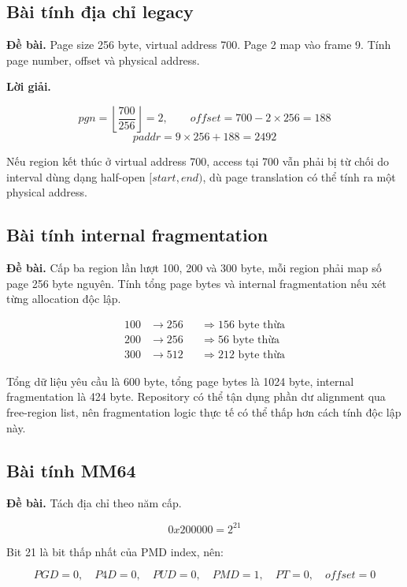 \documentclass[12pt,a4paper]{article}
\newcommand{\code}[1]{\texttt{\detokenize{#1}}}
\begin{document}
\subsection{Bài tính địa chỉ legacy}

\textbf{Đề bài.} Page size 256 byte, virtual address 700. Page 2 map vào frame
9. Tính page number, offset và physical address.

\textbf{Lời giải.}

\[
pgn=\left\lfloor\frac{700}{256}\right\rfloor=2,\qquad
offset=700-2\times256=188
\]
\[
paddr=9\times256+188=2492
\]

Nếu region kết thúc ở virtual address 700, access tại 700 vẫn phải bị từ chối
do interval dùng dạng half-open \([start,end)\), dù page translation có thể
tính ra một physical address.

\subsection{Bài tính internal fragmentation}

\textbf{Đề bài.} Cấp ba region lần lượt 100, 200 và 300 byte, mỗi region phải
map số page 256 byte nguyên. Tính tổng page bytes và internal fragmentation
nếu xét từng allocation độc lập.

\[
\begin{aligned}
100 &\rightarrow 256 &&\Rightarrow 156\text{ byte thừa}\\
200 &\rightarrow 256 &&\Rightarrow 56\text{ byte thừa}\\
300 &\rightarrow 512 &&\Rightarrow 212\text{ byte thừa}
\end{aligned}
\]

Tổng dữ liệu yêu cầu là 600 byte, tổng page bytes là 1024 byte, internal
fragmentation là 424 byte. Repository có thể tận dụng phần dư alignment qua
free-region list, nên fragmentation logic thực tế có thể thấp hơn cách tính
độc lập này.

\subsection{Bài tính MM64}

\textbf{Đề bài.} Tách địa chỉ \code{0x200000} theo năm cấp.

\[
0x200000 = 2^{21}
\]

Bit 21 là bit thấp nhất của PMD index, nên:

\[
PGD=0,\quad P4D=0,\quad PUD=0,\quad PMD=1,\quad PT=0,\quad offset=0
\]
\end{document}
